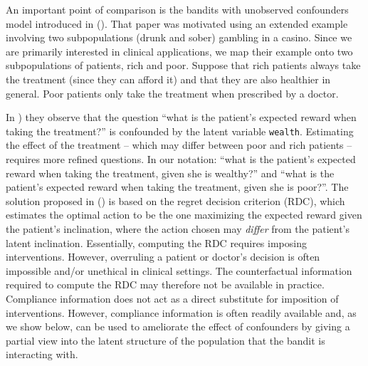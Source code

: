 An important point of comparison is the bandits with unobserved confounders model introduced in (\cite{bareinboim:15}). That paper was motivated using an extended example involving two subpopulations (drunk and sober) gambling in a casino. Since we are primarily interested in clinical applications, we map their example onto two subpopulations of patients, rich and poor. Suppose that rich patients always take the treatment (since they can afford it) and that they are also healthier in general. Poor patients only take the treatment when prescribed by a doctor.

In \cite{bareinboim:15}) they observe that the question ``what is the patient's expected reward when taking the treatment?'' is confounded by the latent variable \texttt{wealth}. Estimating the effect of the treatment -- which may differ between poor and rich patients -- requires more refined questions. In our notation: 
``what is the patient's expected reward when taking the treatment, given she is wealthy?'' and  ``what is the patient's expected reward when taking the treatment, given she is poor?''.%
The solution proposed in (\cite{bareinboim:15}) is based on the regret decision criterion (RDC), which estimates the optimal action to be the one maximizing the expected reward given the patient's inclination, where the action chosen may \emph{differ} from the patient's latent inclination. Essentially, computing the RDC requires imposing interventions. However, overruling a patient or doctor's decision is often impossible and/or unethical in clinical settings. The counterfactual information required to compute the RDC may therefore not be available in practice.
Compliance information does not act as a direct substitute for imposition of interventions. However, compliance information is often readily available and, as we show below, can be used to ameliorate the effect of confounders by giving a partial view into the latent structure of the population that the bandit is interacting with.
